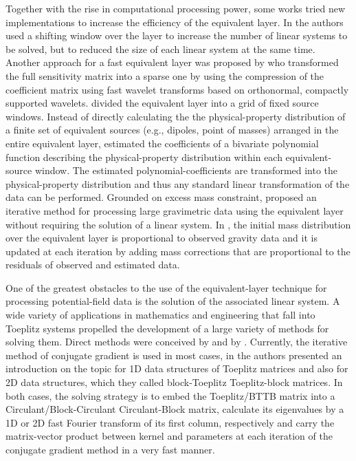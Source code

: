 \documentclass[manuscript,noblind]{geophysics}
\begin{document}
Together with the rise in computational processing power, some works tried new implementations to increase the efficiency of the equivalent layer. 
In \cite{leao-silva1989} the authors used a shifting window over the layer to increase the number of linear systems to be solved, but to reduced the size of each linear system at the same time. 
Another approach for a fast equivalent layer was proposed by \cite{li-oldenburg2010}  who transformed the full sensitivity matrix into a sparse one by using  the compression of the coefficient matrix 
using fast wavelet transforms based on orthonormal, compactly supported wavelets.  
\cite{oliveirajr-etal2013} divided the equivalent layer into a grid of fixed source windows.
Instead of directly calculating the the physical-property distribution of a finite set of equivalent
sources (e.g., dipoles, point of masses) arranged in the entire equivalent layer,
\cite{oliveirajr-etal2013} estimated the coefficients of a bivariate polynomial function describing 
the physical-property distribution within each equivalent-source window.
The estimated polynomial-coefficients are transformed into the physical-property distribution
and thus any standard linear transformation of the data can be performed.
Grounded on excess mass constraint, \cite{siqueira-etal2017} proposed an iterative method 
for processing large gravimetric data using the equivalent layer without requiring the solution 
of a linear system. 
In \cite{siqueira-etal2017}, the initial mass distribution over the equivalent layer is
proportional to observed gravity data and it is updated at each iteration by adding mass corrections that are proportional to the residuals of observed and estimated data.

One of the greatest obstacles to the use of the equivalent-layer technique for processing potential-field data is the solution of the associated linear system.
A wide variety of applications in mathematics and engineering that fall into Toeplitz systems propelled the development of a large variety of  methods for solving them. Direct methods were conceived by \cite{levinson1946} and by \cite{trench1964}. Currently, the iterative method of conjugate gradient is used in most cases, in \cite{chan-jin2007} the authors presented an introduction on the topic for 1D data structures of Toeplitz matrices and also for 2D data structures, which they called block-Toeplitz Toeplitz-block matrices. In both cases, the solving strategy is to embed the Toeplitz/BTTB matrix into a Circulant/Block-Circulant Circulant-Block matrix, calculate its eigenvalues by a 1D or 2D fast Fourier transform of its first column, respectively and carry the matrix-vector product between kernel and parameters at each iteration of the conjugate gradient method in a very fast manner.
\end{document}
